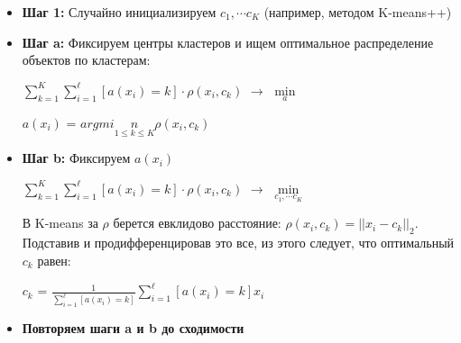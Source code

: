         \begin{itemize}
            \item \textbf{Шаг 1:} \quad Случайно инициализируем  $c_1, \cdots c_K$ (например, методом K-means++)

            \item \textbf{Шаг a:} \quad Фиксируем центры кластеров и ищем оптимальное распределение объектов по кластерам:
                \begin{center}
                    $\sum\limits_{k = 1}^K\sum\limits_{i = 1}^\ell[a(x_i) = k]\cdot\rho(x_i, c_k)$ $\longrightarrow$ $\min\limits_a$
                \end{center}
                \begin{center}
                    $a(x_i)$ = $argmin\limits_{1 \leq k \leq K}\rho(x_i, c_k)$
                \end{center}

            \item \textbf{Шаг b:} \quad Фиксируем $a(x_i)$
                \begin{center}
                    $\sum\limits_{k = 1}^K\sum\limits_{i = 1}^\ell[a(x_i) = k]\cdot\rho(x_i, c_k)$ $\longrightarrow$ $\min\limits_{c_1, \cdots c_K}$
                \end{center}

                В K-means за $\rho$ берется евклидово расстояние: \quad $\rho(x_i, c_k) = ||x_i - c_k||_2$.\\

                Подставив и продифференцировав это все, из этого следует, что оптимальный $c_k$ равен:
                \begin{center}
                \Large
                    $c_k$ = $\frac{1}{\sum\limits_{i = 1}^\ell[a(x_i) = k]}\sum\limits_{i = 1}^\ell[a(x_i) = k]x_i$
                \end{center}

            \item \textbf{Повторяем шаги a и b до сходимости}
        \end{itemize}
        


